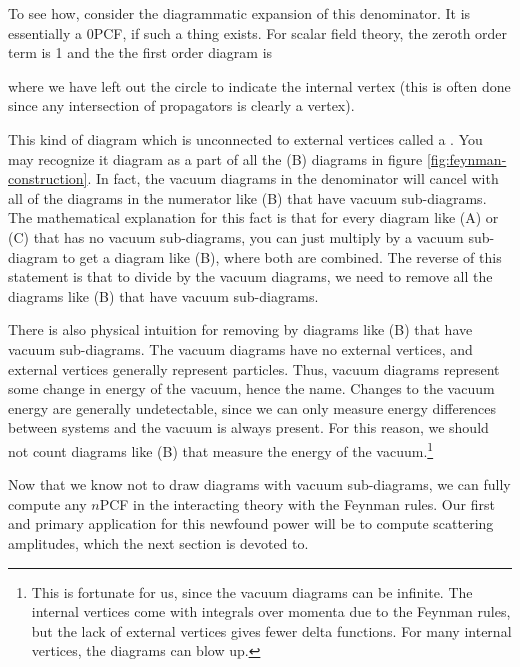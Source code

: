 To see how, consider the diagrammatic expansion of this denominator. It is essentially a 0PCF, if such a thing exists. For scalar field theory, the zeroth order term is 1 and the the first order diagram is
\begin{center}
\end{center}
where we have left out the circle to indicate the internal vertex (this is often done since any intersection of propagators is clearly a vertex).

This kind of diagram which is unconnected to external vertices called a . You may recognize it diagram as a part of all the (B) diagrams in figure \ref{fig:feynman-construction}. In fact, the vacuum diagrams in the denominator will cancel with all of the diagrams in the numerator like (B) that have vacuum sub-diagrams. The mathematical explanation for this fact is that for every diagram like (A) or (C) that has no vacuum sub-diagrams, you can just multiply by a vacuum sub-diagram to get a diagram like (B), where both are combined. The reverse of this statement is that to divide by the vacuum diagrams, we need to remove all the diagrams like (B) that have vacuum sub-diagrams.

There is also physical intuition for removing by diagrams like (B) that have vacuum sub-diagrams. The vacuum diagrams have no external vertices, and external vertices generally represent particles. Thus, vacuum diagrams represent some change in energy of the vacuum, hence the name. Changes to the vacuum energy are generally undetectable, since we can only measure energy differences between systems and the vacuum is always present. For this reason, we should not count diagrams like (B) that measure the energy of the vacuum.\footnote{This is fortunate for us, since the vacuum diagrams can be infinite. The internal vertices come with integrals over momenta due to the Feynman rules, but the lack of external vertices gives fewer delta functions. For many internal vertices, the diagrams can blow up.}

Now that we know not to draw diagrams with vacuum sub-diagrams, we can fully compute any $n$PCF in the interacting theory with the Feynman rules. Our first and primary application for this newfound power will be to compute scattering amplitudes, which the next section is devoted to.

